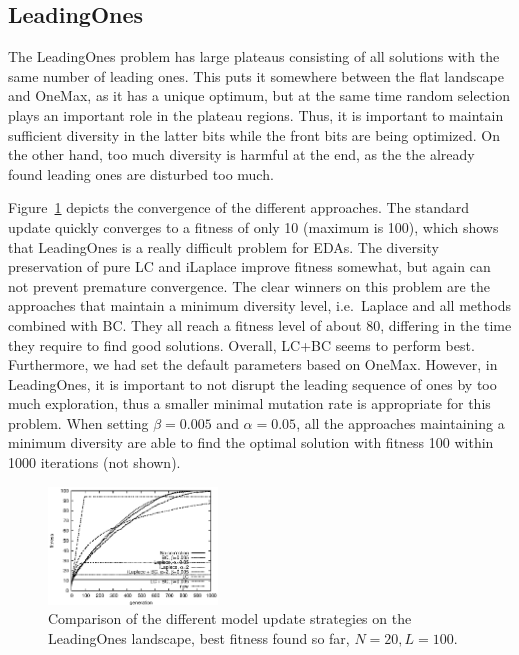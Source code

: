 \documentclass{acm_proc_article-sp}
\newcommand{\Np}{N}
\begin{document}
\subsection{LeadingOnes}
\label{sec:leading}

The LeadingOnes problem has large plateaus consisting of all solutions
with the same number of leading ones. This puts it somewhere between the
flat landscape and OneMax, as it has a unique optimum, but at the same
time random selection plays an important role in the plateau
regions. Thus, it is important to maintain sufficient diversity in the
latter bits while the front bits are being optimized. On the other hand, too
much diversity is harmful at the end, as the the already found leading
ones are disturbed too much.

Figure~\ref{fig:leadingOnes} depicts the convergence of the different approaches. 
The standard update quickly converges to a fitness of only 10 (maximum is 100), 
which shows that LeadingOnes is a really difficult problem for EDAs.
The diversity preservation of pure LC and iLaplace improve fitness somewhat, but again can not
prevent premature convergence. The clear winners on this problem
are the approaches that maintain a minimum diversity level, i.e.\ 
Laplace and all methods combined with BC. They all reach a fitness level of about
80, differing in the time they require to find good solutions. Overall,
LC+BC seems to perform best.
Furthermore, we had set the default parameters based on OneMax. However, in LeadingOnes,
it is important to not disrupt the leading sequence of ones by too much exploration,
thus a smaller minimal mutation rate is appropriate for this problem.
When setting $\beta=0.005$ and $\alpha=0.05$, all the approaches maintaining
a minimum diversity are able to find the optimal solution with fitness 100
within 1000 iterations (not shown).

\begin{figure}
\centerline{
\includegraphics[width=0.4\textwidth]{graph_leading1169910391/graph_leading000_fitness.eps}}
\caption{Comparison of the different model update strategies on the LeadingOnes landscape, best fitness found so far, $\Np=20, L=100$.\label{fig:leadingOnes}}
\end{figure}
\end{document}
